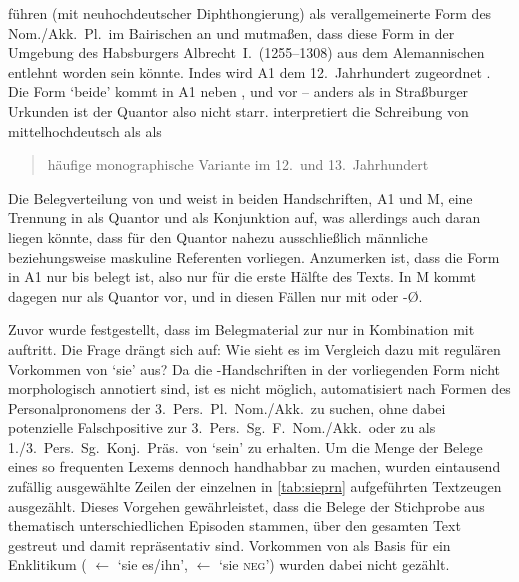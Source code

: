 \citet[396--397]{ksw2} führen  (mit neuhochdeutscher
Diphthongierung) als ver\-all\-gemeinerte Form des Nom./Akk.\ Pl.\ im
Bairischen an und mutmaßen, dass diese Form in der Umgebung des Habsburgers
Albrecht~I.\ (1255--1308) aus dem Alemannischen entlehnt worden sein könnte.
Indes wird A1 dem 12.~Jahrhundert zugeordnet
\autocite{kcdigital,wolf:kckat}. Die Form  `beide' kommt in
A1 neben ,  und  vor -- anders als
in Straßburger Urkunden ist der Quantor also nicht starr.
\citeauthor{wiesinger2001} interpretiert die Schreibung von mittelhochdeutsch
 als  als \blockcquote[103]{wiesinger2001}{häufige
mono\-graphische Variante \textelp{} im 12.\ und 13.~Jahrhundert}.

Die Belegverteilung von  und  weist in beiden
Handschriften, A1 und M, eine Trennung in
 als Quantor und  als Konjunktion auf, was allerdings
auch daran liegen könnte, dass für den Quantor nahezu ausschließlich männliche
beziehungsweise maskuline Referenten vorliegen. Anzumerken ist, dass die Form
 in A1 nur bis  belegt ist,
also nur für die erste Hälfte des Texts. In M kommt
 dagegen nur als Quantor vor, und in diesen Fällen nur mit 
oder -Ø.

Zuvor wurde festgestellt, dass im Belegmaterial zur \KC{} nur
 in Kombination mit  auftritt. Die Frage drängt sich
auf: Wie sieht es im Vergleich dazu mit regulären Vorkommen von `sie' aus?
Da die \KC{}-Hand\-schrif\-ten in der vorliegenden Form nicht
morphologisch annotiert sind, ist es nicht möglich, automatisiert nach Formen
des Personal\-pronomens der 3.~Pers.\ Pl.\ Nom./Akk.\ zu suchen, ohne dabei
potenzielle Falschpositive zur 3.~Pers.\ Sg.~F.\ Nom./Akk.\ oder zu 
als 1./3.~Pers.\ Sg.\ Konj.\ Präs.\ von  `sein' zu erhalten. Um
die Menge der Belege eines so frequenten Lexems dennoch handhabbar zu machen,
wurden eintausend zufällig ausgewählte Zeilen der einzelnen in
\cref{tab:sieprn} aufgeführten Textzeugen ausgezählt. Dieses Vorgehen
gewährleistet, dass die Belege der Stichprobe aus thematisch unterschiedlichen
Episoden stammen, über den gesamten Text gestreut und damit repräsentativ sind.
Vorkommen von  als Basis für ein Enklitikum ( $\gets$
 `sie es/ihn',
 $\gets$  `sie \textsc{neg}') wurden dabei nicht gezählt.

